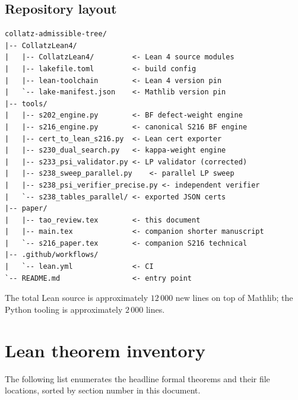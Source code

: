\documentclass[11pt,a4paper]{article}
\theoremstyle{plain}
\theoremstyle{definition}
\begin{document}
\subsection*{Repository layout}

\begin{lstlisting}
collatz-admissible-tree/
|-- CollatzLean4/
|   |-- CollatzLean4/         <- Lean 4 source modules
|   |-- lakefile.toml         <- build config
|   |-- lean-toolchain        <- Lean 4 version pin
|   `-- lake-manifest.json    <- Mathlib version pin
|-- tools/
|   |-- s202_engine.py        <- BF defect-weight engine
|   |-- s216_engine.py        <- canonical S216 BF engine
|   |-- cert_to_lean_s216.py  <- Lean cert exporter
|   |-- s230_dual_search.py   <- kappa-weight engine
|   |-- s233_psi_validator.py <- LP validator (corrected)
|   |-- s238_sweep_parallel.py    <- parallel LP sweep
|   |-- s238_psi_verifier_precise.py <- independent verifier
|   `-- s238_tables_parallel/ <- exported JSON certs
|-- paper/
|   |-- tao_review.tex        <- this document
|   |-- main.tex              <- companion shorter manuscript
|   `-- s216_paper.tex        <- companion S216 technical
|-- .github/workflows/
|   `-- lean.yml              <- CI
`-- README.md                 <- entry point
\end{lstlisting}

The total Lean source is approximately $12\,000$ new lines on top
of Mathlib; the Python tooling is approximately $2\,000$ lines.

\section{Lean theorem inventory}\label{app:theorem-list}

The following list enumerates the headline formal theorems and
their file locations, sorted by section number in this document.
\end{document}
